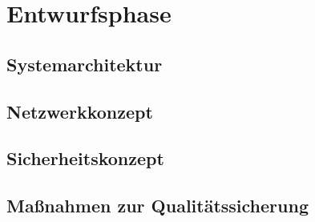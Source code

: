 \section{Entwurfsphase}
\label{sec:Entwurfsphase}

\subsection{Systemarchitektur}
\label{sec:Systemarchitektur}


\subsection{Netzwerkkonzept}
\label{sec:Netzwerkkonzept}


\subsection{Sicherheitskonzept}
\label{sec:Sicherheitskonzept}


\subsection{Maßnahmen zur Qualitätssicherung}
\label{sec:Qualitaetssicherung}

